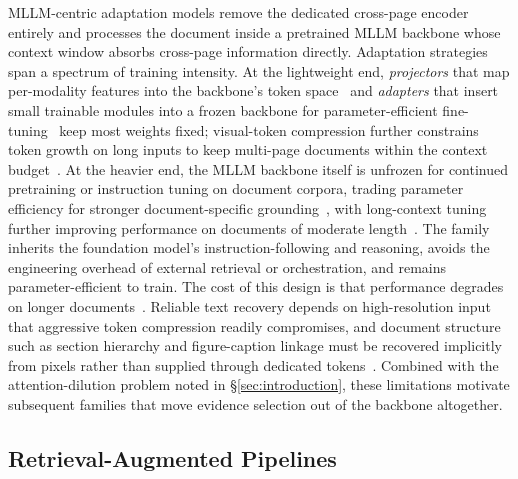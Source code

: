 \documentclass[11pt]{article}
\begin{document}
MLLM-centric adaptation models remove the dedicated cross-page encoder entirely and processes the document inside a pretrained MLLM backbone whose context window absorbs cross-page information directly. Adaptation strategies span a spectrum of training intensity. At the lightweight end, \emph{projectors} that map per-modality features into the backbone's token space~\cite{tanaka2024instructdoc} and \emph{adapters} that insert small trainable modules into a frozen backbone for parameter-efficient fine-tuning~\cite{zhu2025laytokenllm} keep most weights fixed; visual-token compression further constrains token growth on long inputs to keep multi-page documents within the context budget~\cite{hu2025mplugdocowl2}. At the heavier end, the MLLM backbone itself is unfrozen for continued pretraining or instruction tuning on document corpora, trading parameter efficiency for stronger document-specific grounding~\cite{duan2025docopilot}, with long-context tuning further improving performance on documents of moderate length~\cite{hu2024mplugdocowl,yu2024texthawk2}. The family inherits the foundation model's instruction-following and reasoning, avoids the engineering overhead of external retrieval or orchestration, and remains parameter-efficient to train. The cost of this design is that performance degrades on longer documents~\cite{jia2024leopard}. Reliable text recovery depends on high-resolution input that aggressive token compression readily compromises, and document structure such as section hierarchy and figure-caption linkage must be recovered implicitly from pixels rather than supplied through dedicated tokens~\cite{hannan2025docslm,duan2025docopilot}. Combined with the attention-dilution problem noted in \S\ref{sec:introduction}, these limitations motivate subsequent families that move evidence selection out of the backbone altogether.

\subsection{Retrieval-Augmented Pipelines}
\label{sec:arch-ra}
\end{document}
